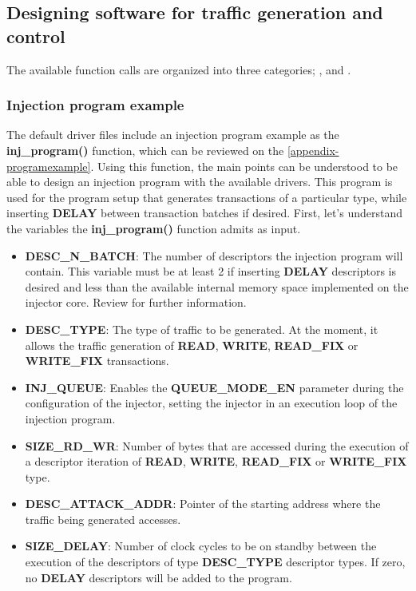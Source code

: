 \subsection{Designing software for traffic generation and control}
\label{software-drivers}

The available function calls are organized into three categories; ,  and .

\subsubsection{Injection program example}
\label{software-drivers-program}

The default driver files include an injection program example as the \textbf{inj\_program()} function, which can be reviewed on the \autoref{appendix-programexample}. 
Using this function, the main points can be understood to be able to design an injection program with the available drivers. 
This program is used for the program setup that generates transactions of a particular type, while inserting \textbf{DELAY} between transaction batches if desired. 
First, let's understand the variables the \textbf{inj\_program()} function admits as input.

\begin{itemize}
  \item \textbf{DESC\_N\_BATCH}: The number of descriptors the injection program will contain. This variable must be at least 2 if inserting \textbf{DELAY} descriptors is desired and less than the available internal memory space implemented on the injector core. Review \fullref{} for further information.
  \item \textbf{DESC\_TYPE}: The type of traffic to be generated. At the moment, it allows the traffic generation of \textbf{READ}, \textbf{WRITE}, \textbf{READ\_FIX} or \textbf{WRITE\_FIX} transactions.
  \item \textbf{INJ\_QUEUE}: Enables the \textbf{QUEUE\_MODE\_EN} parameter during the configuration of the injector, setting the injector in an execution loop of the injection program.
  \item \textbf{SIZE\_RD\_WR}: Number of bytes that are accessed during the execution of a descriptor iteration of \textbf{READ}, \textbf{WRITE}, \textbf{READ\_FIX} or \textbf{WRITE\_FIX} type.
  \item \textbf{DESC\_ATTACK\_ADDR}: Pointer of the starting address where the traffic being generated accesses.
  \item \textbf{SIZE\_DELAY}: Number of clock cycles to be on standby between the execution of the descriptors of type \textbf{DESC\_TYPE} descriptor types. If zero, no \textbf{DELAY} descriptors will be added to the program.
\end{itemize}
\vspace{15px}

